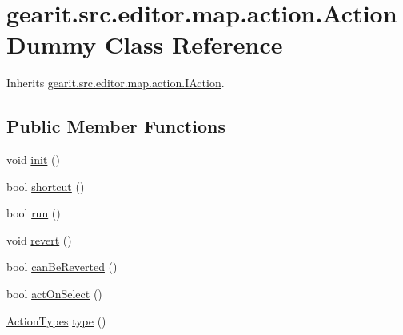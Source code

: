 \hypertarget{classgearit_1_1src_1_1editor_1_1map_1_1action_1_1_action_dummy}{\section{gearit.\+src.\+editor.\+map.\+action.\+Action\+Dummy Class Reference}
\label{classgearit_1_1src_1_1editor_1_1map_1_1action_1_1_action_dummy}
}


Inherits \hyperlink{interfacegearit_1_1src_1_1editor_1_1map_1_1action_1_1_i_action}{gearit.\+src.\+editor.\+map.\+action.\+I\+Action}.

\subsection*{Public Member Functions}
\begin{DoxyCompactItemize}
\item 
void \hyperlink{classgearit_1_1src_1_1editor_1_1map_1_1action_1_1_action_dummy_acc005ffed7648f90f8823104c65a0b56}{init} ()
\item 
bool \hyperlink{classgearit_1_1src_1_1editor_1_1map_1_1action_1_1_action_dummy_a0414352c26f272983050660592ebc536}{shortcut} ()
\item 
bool \hyperlink{classgearit_1_1src_1_1editor_1_1map_1_1action_1_1_action_dummy_ad7ad44c6fb832ea5bc51fbc3fb1b3101}{run} ()
\item 
void \hyperlink{classgearit_1_1src_1_1editor_1_1map_1_1action_1_1_action_dummy_a14a028fea5cccdf1614dbc3686a84a25}{revert} ()
\item 
bool \hyperlink{classgearit_1_1src_1_1editor_1_1map_1_1action_1_1_action_dummy_ae512a0c5fc79085226bc99d9ac9ad2cf}{can\+Be\+Reverted} ()
\item 
bool \hyperlink{classgearit_1_1src_1_1editor_1_1map_1_1action_1_1_action_dummy_a985deb52c892e55d3559721a39b5c07d}{act\+On\+Select} ()
\item 
\hyperlink{namespacegearit_1_1src_1_1editor_1_1map_1_1action_af036712a7d960b13d1e31954e65c00e3}{Action\+Types} \hyperlink{classgearit_1_1src_1_1editor_1_1map_1_1action_1_1_action_dummy_aa4c1e91ae3f0a92e7ab82c9570559f6e}{type} ()
\end{DoxyCompactItemize}


